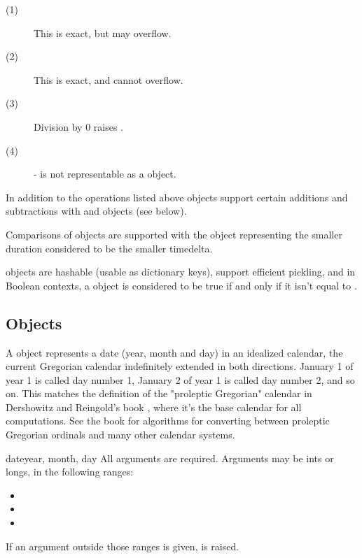 \begin{description}
\item[(1)]
  This is exact, but may overflow.

\item[(2)]
  This is exact, and cannot overflow.

\item[(3)]
  Division by 0 raises .

\item[(4)]
  - is not representable as a  object.
\end{description}

In addition to the operations listed above  objects
support certain additions and subtractions with  and
 objects (see below).

Comparisons of  objects are supported with the
 object representing the smaller duration considered
to be the smaller timedelta.

 objects are hashable (usable as dictionary keys),
support efficient pickling, and in Boolean contexts, a 
object is considered to be true if and only if it isn't equal to
.


\subsection{ Objects \label{datetime-date}}

A  object represents a date (year, month and day) in an idealized
calendar, the current Gregorian calendar indefinitely extended in both
directions.  January 1 of year 1 is called day number 1, January 2 of year
1 is called day number 2, and so on.  This matches the definition of the
"proleptic Gregorian" calendar in Dershowitz and Reingold's book
, where it's the base calendar for all
computations.  See the book for algorithms for converting between
proleptic Gregorian ordinals and many other calendar systems.

\begin{classdesc}{date}{year, month, day}
  All arguments are required.  Arguments may be ints or longs, in the
  following ranges:

  \begin{itemize}
    \item {}
    \item {}
    \item {}
  \end{itemize}

  If an argument outside those ranges is given, 
  is raised.
\end{classdesc}

